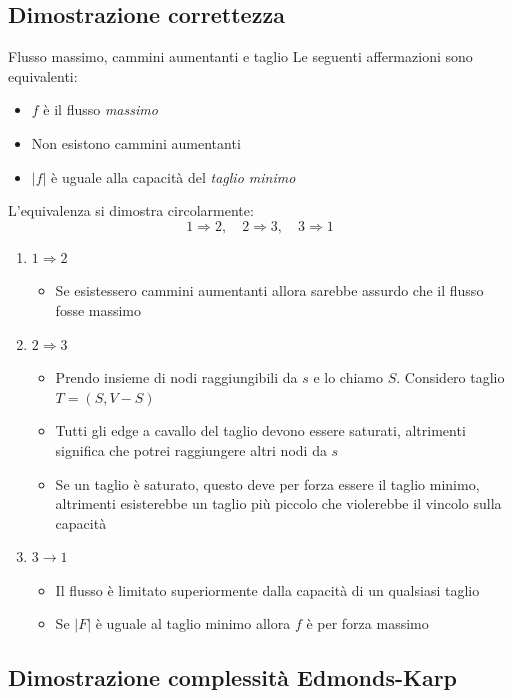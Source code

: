 \subsection{Dimostrazione correttezza}
\begin{teorema}{Flusso massimo, cammini aumentanti e taglio}
	Le seguenti affermazioni sono equivalenti:
	\begin{itemize}
		\item $ f $ è il flusso \textit{massimo}
		\item Non esistono cammini aumentanti
		\item $ \left|f\right| $ è uguale alla capacità del \textit{taglio minimo}
	\end{itemize}
\end{teorema}
L'equivalenza si dimostra circolarmente:
\[
	1 \Rightarrow 2,  \quad 2 \Rightarrow 3, \quad 3 \Rightarrow 1
\]
\begin{enumerate}
	\item $ 1 \Rightarrow 2 $
	      \begin{itemize}
		      \item Se esistessero cammini aumentanti allora sarebbe assurdo che il flusso fosse massimo
	      \end{itemize}
	\item $ 2 \Rightarrow 3 $
	      \begin{itemize}
		      \item Prendo insieme di nodi raggiungibili da $ s $ e lo chiamo $ S $. Considero taglio $ T = \left(S, V-S\right) $
		      \item Tutti gli edge a cavallo del taglio devono essere saturati, altrimenti significa che potrei raggiungere altri nodi da $ s $
		      \item Se un taglio è saturato, questo deve per forza essere il taglio minimo, altrimenti esisterebbe un taglio più piccolo che violerebbe il vincolo sulla capacità
	      \end{itemize}
	\item $ 3 \rightarrow 1 $
	      \begin{itemize}
		      \item Il flusso è limitato superiormente dalla capacità di un qualsiasi taglio
		      \item Se $ \left|F\right| $ è uguale al taglio minimo allora $ f $ è per forza massimo
	      \end{itemize}
\end{enumerate}


\subsection{Dimostrazione complessità Edmonds-Karp}
